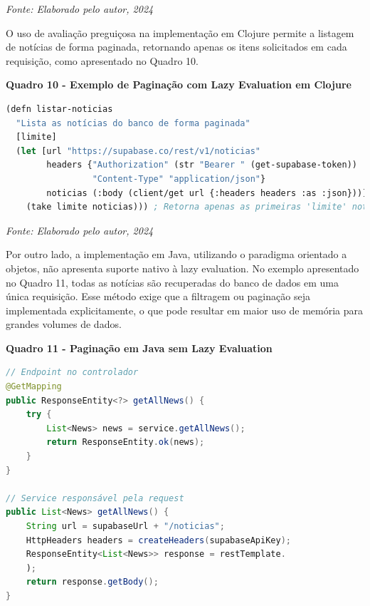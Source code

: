 \begin{center}
    \textit{Fonte: Elaborado pelo autor, 2024} %
\end{center}

O uso de avaliação preguiçosa na implementação em Clojure permite a listagem de notícias de forma paginada, retornando apenas os itens solicitados em cada requisição, como apresentado no Quadro 10.

\begin{center}
    \textbf{Quadro 10 - Exemplo de Paginação com Lazy Evaluation em Clojure}
\end{center}

\begin{tcolorbox}[colback=gray!5!white, colframe=gray!75!black, title=]
\begin{lstlisting}[language=Lisp]
(defn listar-noticias
  "Lista as notícias do banco de forma paginada"
  [limite]
  (let [url "https://supabase.co/rest/v1/noticias"
        headers {"Authorization" (str "Bearer " (get-supabase-token))
                 "Content-Type" "application/json"}
        noticias (:body (client/get url {:headers headers :as :json}))]
    (take limite noticias))) ; Retorna apenas as primeiras 'limite' notícias
\end{lstlisting}
\end{tcolorbox}

\begin{center}
    \textit{Fonte: Elaborado pelo autor, 2024} 
\end{center}

Por outro lado, a implementação em Java, utilizando o paradigma orientado a objetos, não apresenta suporte nativo à lazy evaluation. No exemplo apresentado no Quadro 11, todas as notícias são recuperadas do banco de dados em uma única requisição. Esse método exige que a filtragem ou paginação seja implementada explicitamente, o que pode resultar em maior uso de memória para grandes volumes de dados.

\begin{center}
    \textbf{Quadro 11 - Paginação em Java sem Lazy Evaluation}
\end{center}

\begin{tcolorbox}[colback=gray!5!white, colframe=gray!75!black, title=]
\begin{lstlisting}[language=Java]
// Endpoint no controlador
@GetMapping
public ResponseEntity<?> getAllNews() {
    try {
        List<News> news = service.getAllNews(); 
        return ResponseEntity.ok(news); 
    }
}

// Service responsável pela request
public List<News> getAllNews() {
    String url = supabaseUrl + "/noticias";
    HttpHeaders headers = createHeaders(supabaseApiKey); 
    ResponseEntity<List<News>> response = restTemplate.
    );
    return response.getBody(); 
}
\end{lstlisting}
\end{tcolorbox}

